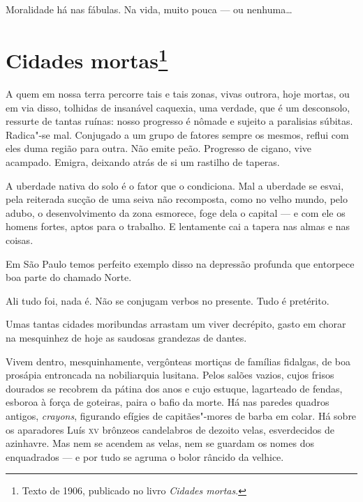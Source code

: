 Moralidade há nas fábulas. Na vida, muito pouca --- ou nenhuma\ldots{}

\chapter{Cidades mortas\footnote[*]{Texto de 1906, publicado no livro \emph{Cidades mortas}.}}

A quem em nossa terra percorre tais e tais zonas, vivas outrora, hoje
mortas, ou em via disso, tolhidas de insanável caquexia, uma verdade,
que é um desconsolo, ressurte de tantas ruínas: nosso progresso é nômade
e sujeito a paralisias súbitas. Radica"-se mal. Conjugado a um grupo de
fatores sempre os mesmos, reflui com eles duma região para outra. Não
emite peão. Progresso de cigano, vive acampado. Emigra, deixando atrás
de si um rastilho de taperas.

A uberdade nativa do solo é o fator que o condiciona. Mal a uberdade se
esvai, pela reiterada sucção de uma seiva não recomposta, como no velho
mundo, pelo adubo, o desenvolvimento da zona esmorece, foge dela o
capital --- e com ele os homens fortes, aptos para o trabalho. E
lentamente cai a tapera nas almas e nas coisas.

Em São Paulo temos perfeito exemplo disso na depressão profunda que
entorpece boa parte do chamado Norte.

Ali tudo foi, nada é. Não se conjugam verbos no presente. Tudo é
pretérito.

Umas tantas cidades moribundas arrastam um viver decrépito, gasto em
chorar na mesquinhez de hoje as saudosas grandezas de dantes.


Vivem dentro, mesquinhamente, vergônteas mortiças de famílias fidalgas,
de boa prosápia entroncada na nobiliarquia lusitana. Pelos salões
vazios, cujos frisos dourados se recobrem da pátina dos anos e cujo
estuque, lagarteado de fendas, esboroa à força de goteiras, paira o
bafio da morte. Há nas paredes quadros antigos, \emph{crayons},
figurando efígies de capitães"-mores de barba em colar. Há sobre os
aparadores Luís \textsc{xv} brônzeos candelabros de dezoito velas, esverdecidos
de azinhavre. Mas nem se acendem as velas, nem se guardam os nomes dos
enquadrados --- e por tudo se agruma o bolor râncido da velhice.

